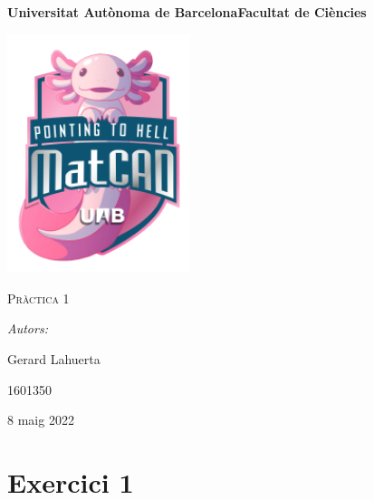 \documentclass[a4paper, 11pt]{article}
\begin{document}
\begin{titlepage}
    \centering
    {\bfseries\LARGE Universitat Autònoma de Barcelona\newline Facultat de Ciències\par}
    \vspace{2cm}
    {\hspace{-1em}\includegraphics[width=0.4\textwidth]{logo.png}\par}
    \vspace{1cm}
    {\scshape\Huge Pràctica 1\par} 
    \vspace{1cm}
    {\Large \itshape Autors: \par}
    {\Large  Gerard Lahuerta \par}
    {\Large 1601350 \par}
    \vspace{1cm}
    {\Large 8 maig 2022\par}
\end{titlepage}

\justifying

\newpage
\setcounter{page}{2}
\pagestyle{plain}
\tableofcontents
\cleardoublepage
{}
\newpage
\section{Exercici 1}
\end{document}
